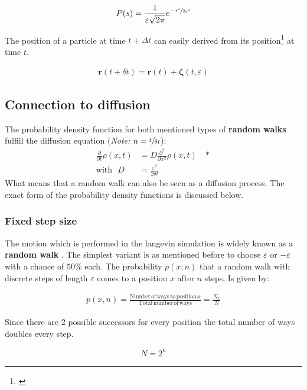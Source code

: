 \documentclass[a4paper, parskip=half]{scrartcl}
\newcommand{\effect}[1]{%
	\textbf{#1}%
}
\newcommand{\myEqLabel}[1]{\label{eq:#1}}
\newcommand{\myEqAnnex}[1]{\;\;\;\ast \myEqLabel{#1}}
\newcommand{\myCite}[1]{\footnote{\cite{#1} \citeauthor{#1} \citetitle{#1} \citeyear{#1}}}
\begin{document}
\begin{align}
P(s) = \frac{1}{\varepsilon \sqrt{2\pi}} e^{-\sfrac{s^2}{2\varepsilon^2}}
\end{align} 

The position of a particle at time $t + \Delta t$ can easily derived from its position\myCite{pinknoise} at time $t$.

\begin{align}
\mathbf{r}(t + \delta t) = \mathbf{r}(t) + \boldsymbol{\zeta}(t, \varepsilon)
\end{align}

\subsection{Connection to diffusion}
The probability density function for both mentioned types of \effect{random walks} fulfill the diffusion equation (\textit{Note: }$n = \sfrac{t}{\delta t}$):
\begin{align}
\frac{\partial}{\partial t} \rho(x,t) &= D \frac{\partial^2}{\partial x^2 } \rho(x,t) \myEqAnnex{diffusion_PDE} \\
\mathrm{with} \, \, \,\, D &= \frac{\varepsilon^2}{2 \delta t} \myEqLabel{def:D}
\end{align}
What means that a random walk can also be seen as a diffusion process. The exact form of the probability density functions is discussed below.
\subsubsection{Fixed step size}
The motion which is performed in the langevin simulation is widely known as a \effect{random walk}. The simplest variant is as mentioned before to choose $\varepsilon$ or $-\varepsilon$ with a chance of $50\%$ each. The probability $p(x, n)$ that a random walk with discrete steps of length $\varepsilon$ comes to a position $x$ after $n$ steps. Is given by:

\begin{align}
p(x, n) = \frac{\mathrm{Number\, of\, ways\, to\, position\,} x}{\mathrm{Total\, number\, of\, ways}} = \frac{N_x}{N}
\end{align}

Since there are 2 possible successors for every position the total number of ways  doubles every step.

\begin{align}
N = 2^n
\end{align}
\end{document}
